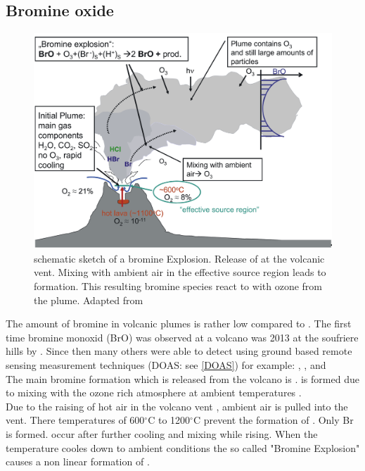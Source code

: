 \documentclass  [
  paper    = a4,
  BCOR     = 10mm,
  twoside,
  fontsize = 12pt,
  fleqn,
  toc      = bibnumbered,
  toc      = listofnumbered,
  numbers  = noendperiod,
  headings = normal,
  listof   = leveldown,
  version  = 3.03
]                                       {scrreprt}
\begin{document}
\subsection{Bromine oxide}
%
\begin{figure}
\centering
\includegraphics[width=0.8\linewidth]{Bilder/Simon/Bilder_Tung/BrO_Plume}
\caption[schematic sketch of a bromine Explosion. Adapted from \citet{bobrowski2007reactive}.]{schematic sketch of a bromine Explosion.
	Release of  at the volcanic vent. Mixing with ambient air in the effective source region leads to  formation. This resulting bromine species react to  with ozone from the plume. Adapted from \citet{bobrowski2007reactive}}
\label{fig:broplume}
\end{figure}
The amount of bromine in volcanic plumes is rather low compared to . The first time bromine monoxid (BrO) was observed at a volcano was 2013 at the soufriere hills by \citet{bobrowski2003detection}. Since then many others were able to detect   using ground based remote sensing measurement techniques (DOAS: see \cref{DOAS}) for example:
\citet{bobrowski2007so2}, \citet{bobrowski2007reactive},\citet{vogel2011volcanic} and \citet{lubcke2014bro}
\\
The main bromine formation which is released from the volcano is  .   is formed due to mixing with the ozone rich atmosphere at ambient temperatures \citep{bobrowski2007reactive}.\\
Due to the raising of hot air in the volcano vent , ambient air is pulled into the vent. There temperatures of  600$^{\circ}$C to 1200$^{\circ}$C    prevent the formation of . Only Br is formed.   occur after further cooling and mixing while rising. When the temperature cooles down to ambient conditions the so called "Bromine Explosion" causes a non linear formation of .
\end{document}
